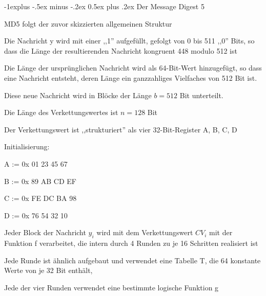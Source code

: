 \documentclass[a4paper]{article}
\makeatletter
\renewcommand{\subsection}{\@startsection{subsection}{2}{0mm}%
 {-1explus -.5ex minus -.2ex}%
 {0.5ex plus .2ex}%
 {\normalfont\normalsize\bfseries}}
\makeatother
\begin{document}
\begin{multicols}{3}
      \subsection{Der Message Digest 5}
      \begin{itemize*}
            \item MD5 folgt der zuvor skizzierten allgemeinen Struktur
            \begin{itemize*}
                  \item Die Nachricht y wird mit einer ,,1'' aufgefüllt, gefolgt von 0 bis 511 ,,0'' Bits, so dass die Länge der resultierenden Nachricht kongruent 448 modulo 512 ist
                  \item Die Länge der ursprünglichen Nachricht wird als 64-Bit-Wert hinzugefügt, so dass eine Nachricht entsteht, deren Länge ein ganzzahliges Vielfaches von 512 Bit ist.
                  \item Diese neue Nachricht wird in Blöcke der Länge $b=512$ Bit unterteilt.
                  \item Die Länge des Verkettungswertes ist $n=128$ Bit
                  \begin{itemize*}
                        \item Der Verkettungswert ist ,,strukturiert'' als vier 32-Bit-Register A, B, C, D
                        \item Initialisierung:
                        \begin{itemize*}
                              \item A := 0x 01 23 45 67
                              \item B := 0x 89 AB CD EF
                              \item C := 0x FE DC BA 98
                              \item D := 0x 76 54 32 10
                        \end{itemize*}
                  \end{itemize*}
                  \item Jeder Block der Nachricht $y_i$ wird mit dem Verkettungswert $CV_i$ mit der Funktion f verarbeitet, die intern durch 4 Runden zu je 16 Schritten realisiert ist
                  \begin{itemize*}
                        \item Jede Runde ist ähnlich aufgebaut und verwendet eine Tabelle T, die 64 konstante Werte von je 32 Bit enthält,
                        \item Jede der vier Runden verwendet eine bestimmte logische Funktion g

\end{itemize*}
\end{itemize*}
\end{itemize*}
\end{multicols}
\end{document}
